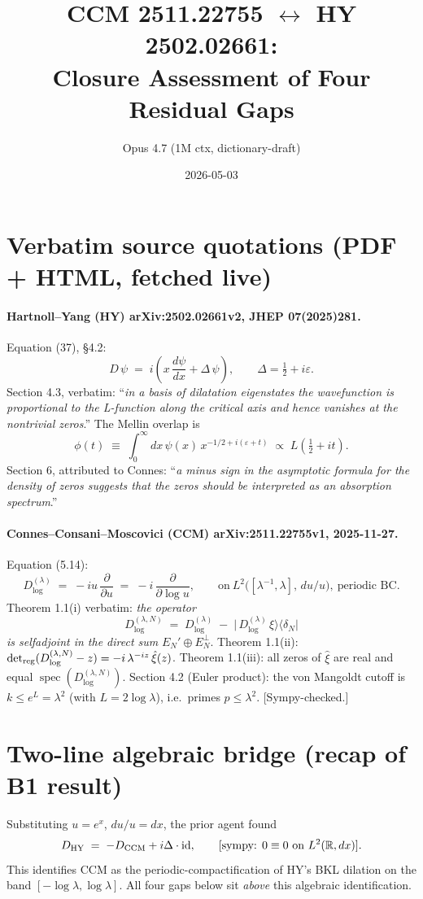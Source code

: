 \documentclass[11pt]{article}
\title{CCM 2511.22755 \(\leftrightarrow\) HY 2502.02661:\\
       Closure Assessment of Four Residual Gaps}
\author{Opus 4.7 (1M ctx, dictionary-draft)}
\date{2026-05-03}
\begin{document}
\maketitle

\section{Verbatim source quotations (PDF + HTML, fetched live)}
\paragraph{Hartnoll--Yang (HY) arXiv:2502.02661v2, JHEP 07(2025)281.}
Equation (37), \S 4.2:
\[
  D\,\psi \;=\; i\!\left(x\,\frac{d\psi}{dx} + \Delta\,\psi\right),
  \qquad \Delta=\tfrac12+i\varepsilon.
\]
Section 4.3, verbatim: ``\emph{in a basis of dilatation eigenstates the
wavefunction is proportional to the L-function along the critical axis
and hence vanishes at the nontrivial zeros}.'' The Mellin overlap is
\[
  \phi(t) \;\equiv\; \int_0^\infty\!\! dx\,\psi(x)\,x^{-1/2 + i(\varepsilon+t)}
  \;\propto\; L(\tfrac12 + it).
  \tag{HY 45}
\]
Section 6, attributed to Connes: ``\emph{a minus sign in the asymptotic
formula for the density of zeros suggests that the zeros should be
interpreted as an absorption spectrum}.''

\paragraph{Connes--Consani--Moscovici (CCM) arXiv:2511.22755v1, 2025-11-27.}
Equation (5.14):
\[
  D_{\log}^{(\lambda)} \;=\; -i u\,\frac{\partial}{\partial u}
                         \;=\; -i\,\frac{\partial}{\partial \log u},
  \qquad \text{on}\ L^2\!\bigl([\lambda^{-1},\lambda],\,du/u\bigr),\
  \text{periodic BC}.
\]
Theorem 1.1(i) verbatim: \emph{the operator}
\[
  D_{\log}^{(\lambda,N)} \;=\; D_{\log}^{(\lambda)}
  \;-\; \bigl|\,D_{\log}^{(\lambda)}\,\xi\bigr\rangle\!\bigl\langle\delta_N\bigr|
\]
\emph{is selfadjoint in the direct sum} \(E_N'\oplus E_N^\perp\).
Theorem 1.1(ii):
\(\det_{\rm reg}(D_{\log}^{(\lambda,N)}-z) = -i\,\lambda^{-iz}\,\hat\xi(z)\).
Theorem 1.1(iii): all zeros of \(\hat\xi\) are real and equal
\(\operatorname{spec}(D_{\log}^{(\lambda,N)})\).
Section 4.2 (Euler product): the von Mangoldt cutoff is
\(k\le e^L=\lambda^2\) (with \(L=2\log\lambda\)), i.e.\ primes
\(p\le \lambda^2\). [Sympy-checked.]

\section{Two-line algebraic bridge (recap of B1 result)}
Substituting \(u=e^x\), \(du/u=dx\), the prior agent found
\[
  D_{\rm HY} \;=\; -D_{\rm CCM} + i\Delta \cdot \mathrm{id},
  \qquad \text{[sympy: } 0\equiv 0 \text{ on } L^2(\mathbb R, dx)\text{]}.
\]
This identifies CCM as the periodic-compactification of HY's BKL
dilation on the band \([-\log\lambda,\log\lambda]\). All four gaps below
sit \emph{above} this algebraic identification.
\end{document}
